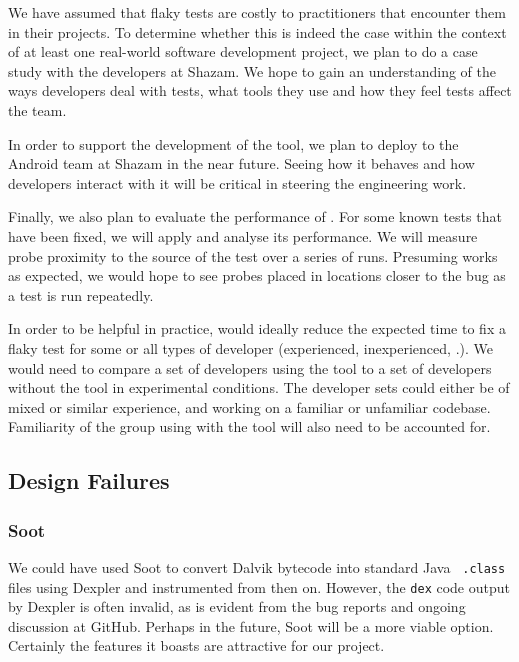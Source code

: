 We have assumed that flaky tests are costly to practitioners that encounter them
in their projects. To determine whether this is indeed the case within the
context of at least one real-world software development project, we plan to do a
case study with the developers at Shazam. We hope to gain an understanding of
the ways developers deal with \flaky tests, what tools they use and how they
feel \flaky tests affect the team.

In order to support the development of the tool, we plan to deploy \venera to
the Android team at Shazam in the near future. Seeing how it behaves and how
developers interact with it will be critical in steering the engineering work.

Finally, we also plan to evaluate the performance of \venera. For some known
\flaky tests that have been fixed, we will apply \venera and analyse its
performance. We will measure probe proximity to the source of the \flaky test
over a series of runs. Presuming \venera works as expected, we would hope to
see probes placed in locations closer to the bug as a test is run repeatedly.

In order to be helpful in practice, \venera would ideally reduce the expected
time to fix a flaky test for some or all types of developer (experienced,
inexperienced, \etc.). We would need to compare a set of developers using the
tool to a set of developers without the tool in experimental conditions. The
developer sets could either be of mixed or similar experience, and working on a
familiar or unfamiliar codebase. Familiarity of the group using \venera with
the tool will also need to be accounted for.


\subsection{Design Failures}

\subsubsection{Soot}

We could have used Soot to convert Dalvik bytecode into standard Java {\tt
.class} files using Dexpler \cite{bartel:soap2012} and instrumented from then
on. However, the {\tt dex} code output by Dexpler is often invalid, as is
evident from the bug reports and ongoing discussion at GitHub. Perhaps in the
future, Soot will be a more viable option. Certainly the features it boasts are
attractive for our project.

